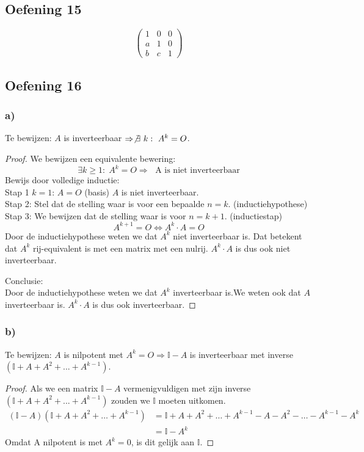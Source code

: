 \documentclass[lineaire_algebra_oplossingen.tex]{subfiles}
\begin{document}
\subsection{Oefening 15}
\[
\begin{pmatrix}
1 & 0 & 0\\
a & 1 & 0\\
b & c & 1
\end{pmatrix}
\]

\subsection{Oefening 16}
\subsubsection*{a)}
Te bewijzen: $A$ is inverteerbaar $\Rightarrow \not \exists\ k :\ A^k=O$.
\begin{proof}
We bewijzen een equivalente bewering:
\[
\exists k\ge 1:\;A^k=O \Rightarrow\; \text{ A is niet inverteerbaar}
\]
Bewijs door volledige inductie:\\
Stap 1 $k=1$: $A=O$ (basis)
$A$ is niet inverteerbaar.\\
Stap 2: Stel dat de stelling waar is voor een bepaalde $n=k$. (inductiehypothese)\\

Stap 3: We bewijzen dat de stelling waar is voor $n=k+1$. (inductiestap)\\
\[ A^{k+1}=O \Leftrightarrow A^{k}\cdot A=O \]
Door de inductiehypothese weten we dat $A^{k}$ niet inverteerbaar is. Dat betekent dat $A^{k}$ rij-equivalent is met een matrix met een nulrij. $A^{k} \cdot A$ is dus ook niet inverteerbaar.

Conclusie:\\
Door de inductiehypothese weten we dat $A^{k}$ inverteerbaar is.We weten ook dat $A$ inverteerbaar is. $A^{k} \cdot A$ is dus ook inverteerbaar.

\end{proof}

\subsubsection*{b)}
Te bewijzen: $A$ is nilpotent met $A^k=O \Rightarrow \mathbb{I}-A$ is inverteerbaar met inverse $(\mathbb{I}+A+A^2+...+A^{k-1})$.
\begin{proof}
Als we een matrix $\mathbb{I}-A$ vermenigvuldigen met zijn inverse $(\mathbb{I}+A+A^2+...+A^{k-1})$ zouden we $\mathbb{I}$ moeten uitkomen.
\begin{align*}
(\mathbb{I}-A)(\mathbb{I}+A+A^2+ \ldots +A^{k-1})
&= \mathbb{I} + A + A^2 + \ldots + A^{k-1} - A - A^2 - \ldots - A^{k-1} - A^k \\
&= \mathbb{I}-A^{k}
\end{align*}
Omdat A nilpotent is met $A^k=0$, is dit gelijk aan $\mathbb{I}.$
\end{proof}
\end{document}
